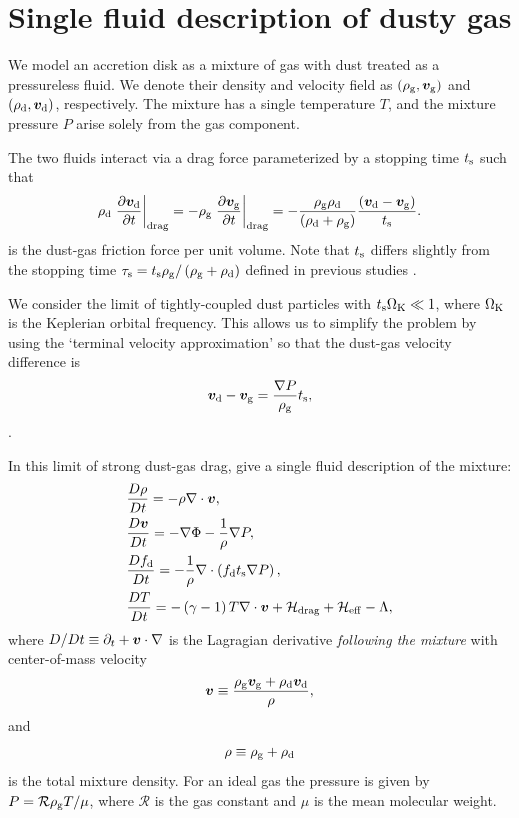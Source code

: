 \section{Single fluid description of dusty gas}\label{setup} 
We model an accretion disk as a mixture of gas with dust treated as a 
pressureless fluid. We denote their density and
velocity field as $(\rho_\mathrm{g},\bm{v}_\mathrm{g})$ and
$(\rho_\mathrm{d},\bm{v}_\mathrm{d})$, respectively. The mixture has a single 
temperature $T$, and the mixture pressure $P$ arise solely from the 
gas component.  

The two fluids interact via a drag force parameterized by a stopping
time $t_\mathrm{s}$ 
such that 
\begin{align}  
  \rho_\mathrm{d}\left.\frac{\partial \bm{v}_\mathrm{d}}{\partial t}\right|_\mathrm{drag}= -
  \rho_\mathrm{g}\left.\frac{\partial \bm{v}_\mathrm{g}}{\partial t}\right|_\mathrm{drag}=
  - \frac{\rho_\mathrm{g}\rho_\mathrm{d}}{\left(\rho_\mathrm{d}+\rho_\mathrm{g}\right)}\frac{\left(\bm{v}_\mathrm{d} -
    \bm{v}_\mathrm{g}\right)}{t_\mathrm{s}}. 
\end{align}
is the dust-gas friction force per unit volume. Note that $t_\mathrm{s}$ 
differs slightly from the stopping time $\tau_\mathrm{s} =
t_\mathrm{s}\rho_\mathrm{g}/\left(\rho_\mathrm{g}+\rho_\mathrm{d}\right)$ defined in previous studies
\citep[e.g.][]{youdin05a,jacquet11}.   

We consider the limit of tightly-coupled dust particles with 
$t_\mathrm{s}\Omega_{\rm K}\ll 1 $, where $\Omega_{\rm K}$ is the Keplerian orbital
frequency. This allows us to simplify the problem by using the
`terminal velocity approximation' so that the dust-gas velocity
difference is 
\begin{align}
  \bm{v}_\mathrm{d} - \bm{v}_\mathrm{g} = \frac{\nabla
    P}{\rho_\mathrm{g}}t_\mathrm{s}, 
\end{align}
\citep{youdin05a,jacquet11}. 

In this limit of strong dust-gas drag, \cite{laibe14} give a single
fluid description of the mixture: 
\begin{align}
  &\frac{D\rho}{Dt} = -\rho\nabla\cdot\bm{v}, \label{masseq}\\ 
  &\frac{D\bm{v}}{Dt} = - \nabla\Phi - \frac{1}{\rho}\nabla  P, \label{momeq}\\ 
  &\frac{Df_\mathrm{d}}{Dt} = -\frac{1}{\rho} \nabla \cdot \left(f_\mathrm{d} 
  t_\mathrm{s} \nabla P \right),\label{dusteq}\\
  &\frac{D T}{D t} = - \left(\gamma-1\right)T\nabla\cdot\bm{v} +
  \mathcal{H}_\mathrm{drag} + \mathcal{H}_\mathrm{eff}  - \Lambda, \label{tempeq} 
\end{align}
where $D/Dt \equiv \partial_t + \bm{v}\cdot\nabla$ is the Lagragian
derivative \emph{following the mixture} with center-of-mass velocity  
\begin{align}
  \bm{v} \equiv \frac{\rho_\mathrm{g}\bm{v}_\mathrm{g} + 
    \rho_\mathrm{d}\bm{v}_\mathrm{d}}{\rho}, 
\end{align}
and 
\begin{align}
  \rho \equiv \rho_\mathrm{g} + \rho_\mathrm{d}
\end{align}
is the total mixture density. For an ideal gas the pressure is given
by $P = \mathcal{R}\rho_\mathrm{g} T/\mu $, where $\mathcal{R}$ is
the gas constant and $\mu$ is the mean molecular weight. 

